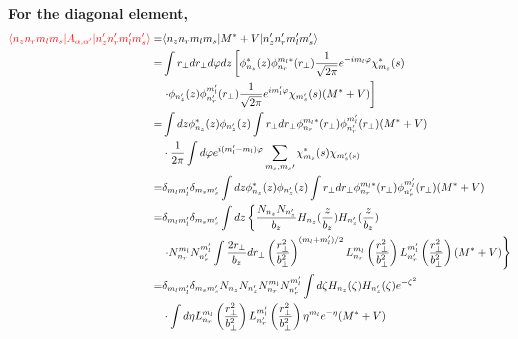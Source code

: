   \textbf{For the diagonal element,}
  \begin{equation}
    \begin{aligned}
      \textcolor{red}{\langle n_z n_r m_l m_s | A_{\alpha, \alpha^{\prime}} | n_z^{\prime} n_r^{\prime} m_l^{\prime} m_s^{\prime} \rangle} =& \langle n_z n_r m_l m_s | M^* + V | n_z^{\prime} n_r^{\prime} m_l^{\prime} m_s^{\prime} \rangle \\
      =& \int r_{\perp}dr_{\perp}d\varphi dz \left[ \phi_{n_z}^{\ast}(z) \phi_{n_r}^{m_l\ast}(r_{\perp}) \frac{1}{\sqrt{2\pi}}e^{-im_l\varphi} \chi_{m_s}^{\ast}(s) \right.\\
      & \left. \cdot \phi_{n_z^{\prime}}(z) \phi_{n_r^{\prime}}^{m_l^{\prime}}(r_{\perp}) \frac{1}{\sqrt{2\pi}}e^{im_l^{\prime}\varphi} \chi_{m_s^{\prime}}(s) (M^{\ast} + V) \right]  \\
      =& \int dz \phi_{n_z}^{\ast}(z)\phi_{n_z^{\prime}}(z) \int r_{\perp}dr_{\perp}\phi_{n_r}^{m_l\ast}(r_{\perp})\phi_{n_r^{\prime}}^{m_l^{\prime}}(r_{\perp})(M^{\ast}+V)  \\
      & \cdot \frac{1}{2\pi} \int d\varphi e^{i(m_l^{\prime} - m_l)\varphi} \sum_{m_s, m_{s}{\prime}} \chi_{m_s}^{\ast}(s)\chi_{m_s^{\prime}(s)}  \\
      =& \delta_{m_l m_l^{\prime}} \delta_{m_s m_s^{\prime}}\int dz \phi_{n_z}^{\ast}(z)\phi_{n_z^{\prime}}(z) \int r_{\perp}dr_{\perp}\phi_{n_r}^{m_l\ast}(r_{\perp})\phi_{n_r^{\prime}}^{m_l^{\prime}}(r_{\perp})(M^{\ast}+V) \\
      =& \delta_{m_l m_l^{\prime}} \delta_{m_s m_s^{\prime}} \int dz \left\{ \frac{N_{n_z} N_{n_z^{\prime}}}{b_z} H_{n_z}(\frac{z}{b_z})H_{n_z^{\prime}}(\frac{z}{b_z})\right. \\
      & \left. \cdot N_{n_r}^{m_l} N_{n_r^{\prime}}^{m_l^{\prime}} \int \frac{2r_{\perp}}{b_z}dr_{\perp} \left(\frac{r_{\perp}^2}{b_{\perp}^2}\right)^{(m_l + m_l^{\prime})/2} L_{n_r}^{m_l}\left(\frac{r_{\perp}^2}{b_{\perp}^2}\right) L_{n_r^{\prime}}^{m_l^{\prime}}\left(\frac{r_{\perp}^2}{b_{\perp}^2}\right) (M^{\ast} + V) \right\}  \\
      =& \delta_{m_l m_l^{\prime}} \delta_{m_s m_s^{\prime}} N_{n_z} N_{n_z^{\prime}} N_{n_r}^{m_l} N_{n_r^{\prime}}^{m_l^{\prime}} \int d\zeta H_{n_z}(\zeta) H_{n_z^{\prime}}(\zeta) e^{-\zeta^2} \\
      & \cdot \int d\eta L_{n_r}^{m_l}\left(\frac{r_{\perp}^2}{b_{\perp}^2}\right) L_{n_r^{\prime}}^{m_l^{\prime}}\left(\frac{r_{\perp}^2}{b_{\perp}^2}\right) \eta^{m_l}e^{-\eta} (M^{\ast} + V)
    \end{aligned}
  \end{equation}
